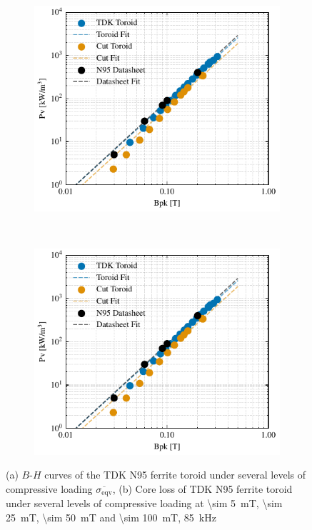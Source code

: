 \documentclass[conference]{IEEEtran}
\begin{document}
\begin{figure}[t]
  \centering
  \begin{subfigure}{\columnwidth}
    \centering
    \includegraphics{figures/24-09-10_BP_curves.pdf}
    \caption{}
    \label{fig:BPcurves}
  \end{subfigure}~
  \begin{subfigure}{\columnwidth}
    \centering
    \includegraphics{figures/24-09-10_BP_curves.pdf}
    \caption{}
    \label{fig:corelossstress}
  \end{subfigure}
  \caption{(a) $B$-$H$ curves of the TDK N95 ferrite toroid under several levels of compressive loading $\overline{\sigma_\text{eqv}}$, (b) Core loss of TDK N95 ferrite toroid under several levels of compressive loading at \SI{\sim 5}{\milli\tesla}, \SI{\sim 25}{\milli\tesla}, \SI{\sim 50}{\milli\tesla} and \SI{\sim 100}{\milli\tesla}, \SI{85}{\kilo\hertz}}
\end{figure}
\end{document}
